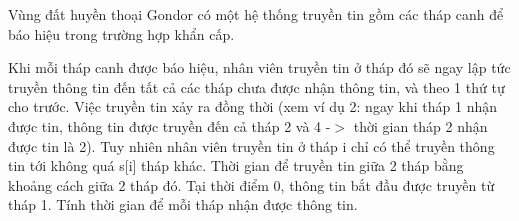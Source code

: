Vùng đất huyền thoại Gondor có một hệ thống truyền tin gồm các tháp canh để báo hiệu trong trường hợp khẩn cấp.

Khi mỗi tháp canh được báo hiệu, nhân viên truyền tin ở tháp đó sẽ ngay lập tức truyền thông tin đến tất cả các tháp chưa được nhận thông tin, và theo 1 thứ tự cho trước. Việc truyền tin xảy ra đồng thời (xem ví dụ 2: ngay khi tháp 1 nhận được tin, thông tin được truyền đến cả tháp 2 và 4 -$>$ thời gian tháp 2 nhận được tin là 2). Tuy nhiên nhân viên truyền tin ở tháp i chỉ có thể truyền thông tin tới không quá s[i] tháp khác. Thời gian để truyền tin giữa 2 tháp bằng khoảng cách giữa 2 tháp đó. Tại thời điểm 0, thông tin bắt đầu được truyền từ tháp 1. Tính thời gian để mỗi tháp nhận được thông tin.